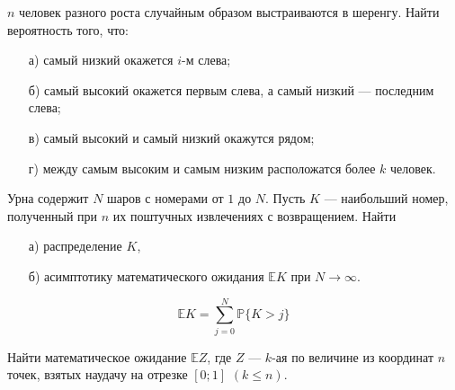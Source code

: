 


\begin{problem}
$n$ человек разного роста случайным образом выстраиваются в шеренгу. Найти вероятность того, что: 
\begin{enumerate}
\item[а)] самый низкий окажется $i$-м слева; 
\item[б)] самый высокий окажется первым слева, а самый низкий --- последним слева; 
\item[в)] самый высокий и самый низкий окажутся рядом; 
\item[г)] между самым высоким и самым низким расположатся более $k$ человек. 
\end{enumerate}
\end{problem}


\begin{problem}
Урна содержит $N$ шаров с номерами от $1$ до $N$. Пусть $K$ --- наибольший номер, полученный при $n$ их поштучных извлечениях 
с возвращением. Найти 
\begin{enumerate}
\item[а)] распределение $K$, 
\item[б)] асимптотику математического ожидания ${\mathbb E}K$ при $N\to\infty$. 
\end{enumerate}
\end{problem}

\begin{ordre}
\[
{\mathbb E}K=\sum\limits_{j=0}^{N} {\mathbb P}\{ K>j\}
\]
\end{ordre}

\begin{problem}
Найти математическое ожидание ${\mathbb E}Z$, где $Z$ --- $k$-ая по величине из координат $n$ точек, взятых наудачу на отрезке 
$[0;1]$ $(k \leqslant n)$. 
\end{problem}

